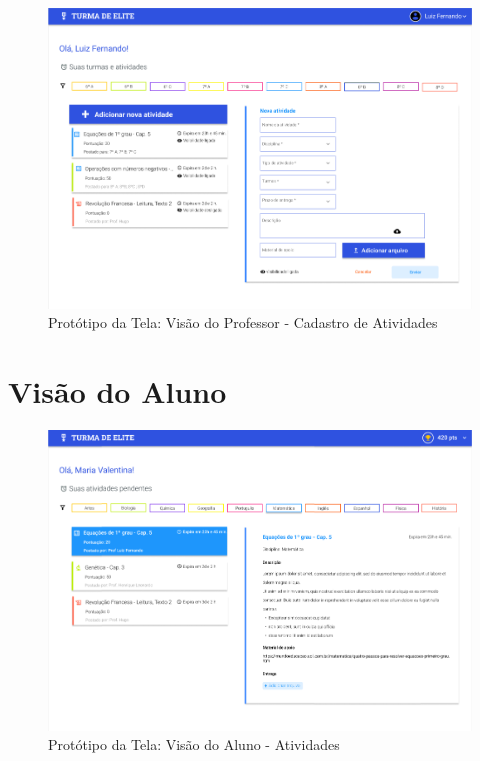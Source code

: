 \documentclass[
    12pt,               %
    openright,          %
    oneside,
    a4paper,            %
    english,            %
    brazil              %
    ]{ifsp-spo-inf-ctds} %
\begin{document}
\begin{apendicesenv}
\begin{figure}[htb]
    \centering
	\includegraphics[width=16cm]{imagens/Professor-CadastroAtividades.png}
	\caption{\label{fig:professor} Protótipo da Tela: Visão do Professor - Cadastro de Atividades}
\end{figure}
\FloatBarrier


\section{Visão do Aluno}

\begin{figure}[htb]
    \centering
	\includegraphics[width=16cm]{imagens/Aluno-Atividades.png}
	\caption{\label{fig:aluno} Protótipo da Tela: Visão do Aluno - Atividades}
\end{figure}
\FloatBarrier


\end{apendicesenv}
\end{document}
